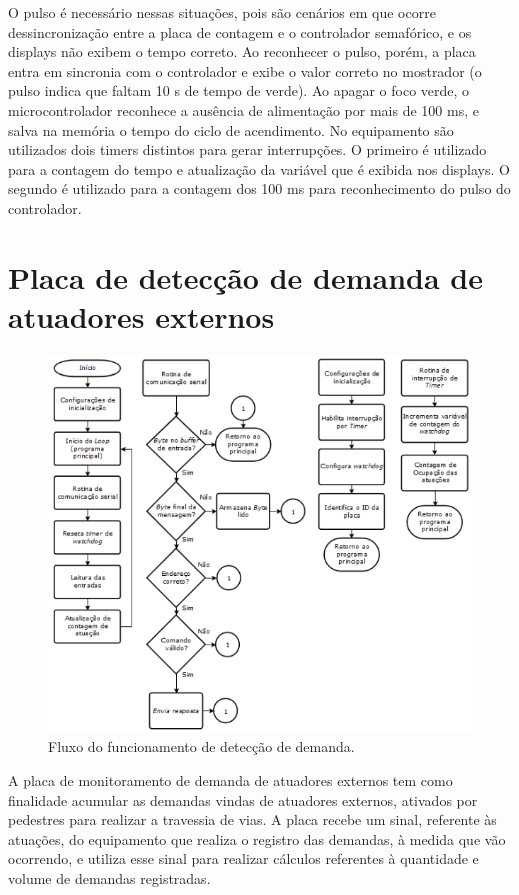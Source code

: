 O pulso é necessário nessas situações, pois são cenários em que ocorre dessincronização entre a placa de contagem e o controlador semafórico, e os displays não exibem o tempo correto. Ao reconhecer o pulso, porém, a placa entra em sincronia com o controlador e exibe o valor correto no mostrador (o pulso indica que faltam 10 s de tempo de verde). Ao apagar o foco verde, o microcontrolador reconhece a ausência de alimentação por mais de 100 ms, e salva na memória o tempo do ciclo de acendimento.
No equipamento são utilizados dois timers distintos para gerar interrupções. O primeiro é utilizado para a contagem do tempo e atualização da variável que é exibida nos displays. O segundo é utilizado para a contagem dos 100 ms para reconhecimento do pulso do controlador.

\section{Placa de detecção de demanda de atuadores externos}

\begin{figure}[ht]
    \begin{center}
    \includegraphics{figuras/fluxo_atdr.PNG}
    \end{center}
    \caption[Fluxograma do atuador]{Fluxo do funcionamento de detecção de demanda.}
    \label{fluxo_atdr}
\end{figure}

A placa de monitoramento de demanda de atuadores externos tem como finalidade acumular as demandas vindas de atuadores externos, ativados por pedestres para realizar a travessia de vias. A placa recebe um sinal, referente às atuações, do equipamento que realiza o registro das demandas, à medida que vão ocorrendo, e utiliza esse sinal para realizar cálculos referentes à quantidade e volume de demandas registradas.

